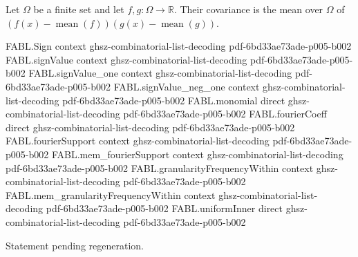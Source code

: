 \begin{definition}
\label{FABL.covariance}
\leanok
{}
Let $\Omega$ be a finite set and let $f,g\colon\Omega\to\mathbb R$. Their covariance is
the mean over $\Omega$ of $(f(x)-\operatorname{mean}(f))(g(x)-\operatorname{mean}(g))$.
\end{definition}

\begin{theorem}
\label{FABL.fourierCoeff_eq_uniformInner}
\leanok
{}
\proofstep
  {FABL.Sign}
  {context}
  {ghsz-combinatorial-list-decoding}
  {pdf-6bd33ae73ade-p005-b002}
\proofstep
  {FABL.signValue}
  {context}
  {ghsz-combinatorial-list-decoding}
  {pdf-6bd33ae73ade-p005-b002}
\proofstep
  {FABL.signValue_one}
  {context}
  {ghsz-combinatorial-list-decoding}
  {pdf-6bd33ae73ade-p005-b002}
\proofstep
  {FABL.signValue_neg_one}
  {context}
  {ghsz-combinatorial-list-decoding}
  {pdf-6bd33ae73ade-p005-b002}
\proofstep
  {FABL.monomial}
  {direct}
  {ghsz-combinatorial-list-decoding}
  {pdf-6bd33ae73ade-p005-b002}
\proofstep
  {FABL.fourierCoeff}
  {direct}
  {ghsz-combinatorial-list-decoding}
  {pdf-6bd33ae73ade-p005-b002}
\proofstep
  {FABL.fourierSupport}
  {context}
  {ghsz-combinatorial-list-decoding}
  {pdf-6bd33ae73ade-p005-b002}
\proofstep
  {FABL.mem_fourierSupport}
  {context}
  {ghsz-combinatorial-list-decoding}
  {pdf-6bd33ae73ade-p005-b002}
\proofstep
  {FABL.granularityFrequencyWithin}
  {context}
  {ghsz-combinatorial-list-decoding}
  {pdf-6bd33ae73ade-p005-b002}
\proofstep
  {FABL.mem_granularityFrequencyWithin}
  {context}
  {ghsz-combinatorial-list-decoding}
  {pdf-6bd33ae73ade-p005-b002}
\proofstep
  {FABL.uniformInner}
  {direct}
  {ghsz-combinatorial-list-decoding}
  {pdf-6bd33ae73ade-p005-b002}

Statement pending regeneration.
\end{theorem}

